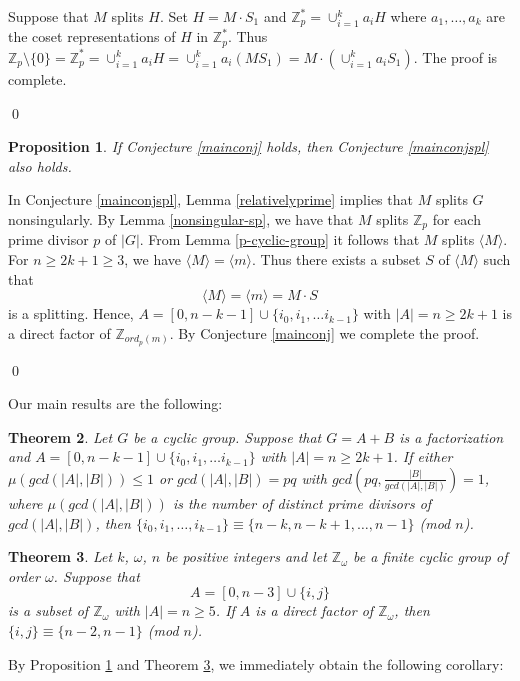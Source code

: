 \documentclass[preprint]{elsarticle}
\newtheorem{thm}{Theorem}
\newtheorem{prop}[thm]{Proposition}
\begin{document}
Suppose that $M$ splits $H$.
Set $H=M\cdot S_1$ and $\mathbb{Z}_p^*=\cup_{i=1}^k a_iH$
where $a_1,\ldots ,a_k$ are the coset representations of $H$ in $\mathbb{Z}_p^*$.
Thus $\mathbb{Z}_p\setminus \{0\}=\mathbb{Z}_p^*=\cup_{i=1}^k a_iH=\cup_{i=1}^k a_i(MS_1)=M\cdot (\cup_{i=1}^k a_iS_1)$. The proof is complete.

\qed


\begin{prop} \label{cover}
If Conjecture \ref{mainconj} holds, then Conjecture \ref{mainconjspl} also holds.
\end{prop}

\pf
In Conjecture \ref{mainconjspl}, Lemma \ref{relativelyprime} implies that $M$ splits $G$ nonsingularly.
By Lemma \ref{nonsingular-sp}, we have that $M$ splits $\mathbb{Z}_p$ for each prime divisor $p$ of $|G|$.
From Lemma \ref{p-cyclic-group} it follows that $M$ splits $\langle M\rangle$.
For $n\geq 2k+1\geq 3$, we have $\langle M\rangle=\langle m\rangle$.
Thus there exists a subset $S$ of $\langle M\rangle$ such that
$$\langle M\rangle=\langle m\rangle=M\cdot S$$ is a splitting.
Hence, $A=[0,n-k-1]\cup\{i_0,i_1,\ldots i_{k-1}\}$ with $|A|=n\geq 2k+1$ is a direct factor of $\mathbb{Z}_{ord_p(m)}$.
By Conjecture \ref{mainconj} we complete the proof.

\qed






Our main results are the following:

\begin{thm}\label{mainthm}
Let $G$ be a cyclic group.
Suppose that $G = A+B$ is a factorization and $A=[0,n-k-1]\cup\{i_0,i_1,\ldots i_{k-1}\}$
with $|A|=n\geq 2k+1$.
If either $\mu(gcd(|A|,|B|))\leq 1$ or $gcd(|A|,|B|)=pq$ with $gcd(pq,\frac{|B|}{gcd(|A|,|B|)})=1$,
where $\mu(gcd(|A|,|B|))$ is the number of distinct prime divisors of $gcd(|A|,|B|)$,
then $\{i_0,i_1,\ldots ,i_{k-1}\}\equiv \{n-k,n-k+1,\ldots ,n-1\}$ (mod $n$).
\end{thm}

\begin{thm} \label{thm5}
Let $k$, $\omega$, $n$ be positive integers and let $\mathbb{Z}_{\omega}$ be a finite cyclic group of order $\omega$.
Suppose that $$A=[0,n-3]\cup\{i,j\}$$
is a subset of $\mathbb{Z}_{\omega}$ with $|A|=n\geq 5$.
If $A$ is a direct factor of $\mathbb{Z}_{\omega}$, then $\{i,j\}\equiv \{n-2,n-1\}$ (mod $n$).
\end{thm}

By Proposition \ref{cover} and Theorem \ref{thm5}, we immediately obtain the following corollary:
\end{document}
